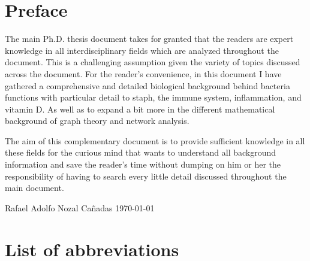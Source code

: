 \documentclass[12pt,twoside,a4paper,fleqn, english]{report}
\begin{document}
\chapter*{Preface}

        The main Ph.D. thesis document takes for granted that the readers are expert knowledge in all interdisciplinary fields which are analyzed throughout the document. This is a challenging assumption given the variety of topics discussed across the document. For the reader's convenience, in this document I have gathered a comprehensive and detailed biological background behind bacteria functions with particular detail to \gls{staph}, the immune system, inflammation, and vitamin D. As well as to expand a bit more in the different mathematical background of graph theory and network analysis.

        The aim of this complementary document is to provide sufficient knowledge in all these fields for the curious mind that wants to understand all background information and save the reader's time without dumping on him or her the responsibility of having to search every little detail discussed throughout the main document.

        Rafael Adolfo Nozal Cañadas
        \today

    \cleardoublepage

%
\chapter*{List of abbreviations}

\printglossary[type=\acronymtype,title=Abbreviations]

%
\setcounter{tocdepth}{4}            %
\tableofcontents                    %
\cleardoublepage                    %


\pagestyle{fancy}               	%
\setlength{\parindent}{20pt}        %
\end{document}
